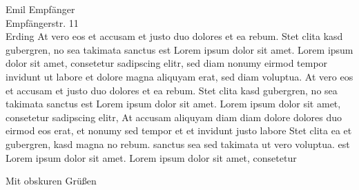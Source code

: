 \documentclass{scrlttr2}
\begin{document}
\begin{letter}{Emil Empfänger\\Empfängerstr. 11\\Erding}
  At vero eos et accusam et justo duo dolores et ea rebum. Stet clita kasd
  gubergren, no sea takimata sanctus est Lorem ipsum dolor sit amet. Lorem ipsum
  dolor sit amet, consetetur sadipscing elitr, sed diam nonumy eirmod tempor
  invidunt ut labore et dolore magna aliquyam erat, sed diam voluptua. At vero
  eos et accusam et justo duo dolores et ea rebum. Stet clita kasd gubergren, no
  sea takimata sanctus est Lorem ipsum dolor sit amet. Lorem ipsum dolor sit
  amet, consetetur sadipscing elitr, At accusam aliquyam diam diam dolore
  dolores duo eirmod eos erat, et nonumy sed tempor et et invidunt justo labore
  Stet clita ea et gubergren, kasd magna no rebum. sanctus sea sed takimata ut
  vero voluptua. est Lorem ipsum dolor sit amet. Lorem ipsum dolor sit amet,
  consetetur

  \closing{Mit obskuren Grüßen}
\end{letter}
\end{document}
